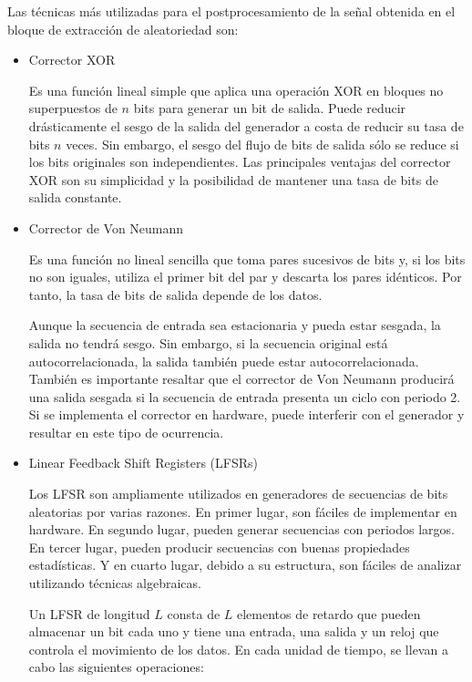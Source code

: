             Las técnicas más utilizadas para el postprocesamiento de la señal obtenida en el bloque de extracción de aleatoriedad son: 
	
            \begin{itemize}
                \item Corrector XOR 
                
                    Es una función lineal simple que aplica una operación XOR en bloques no superpuestos de $n$ bits para generar un bit de salida. Puede reducir drásticamente el sesgo de la salida del generador a costa de reducir su tasa de bits $n$ veces. Sin embargo, el sesgo del flujo de bits de salida sólo se reduce si los bits originales son independientes. Las principales ventajas del corrector XOR son su simplicidad y la posibilidad de mantener una tasa de bits de salida constante.

                \item Corrector de Von Neumann
                
                    Es una función no lineal sencilla que toma pares sucesivos de bits y, si los bits no son iguales, utiliza el primer bit del par y descarta los pares idénticos. Por tanto, la tasa de bits de salida depende de los datos.

                    Aunque la secuencia de entrada sea estacionaria y pueda estar sesgada, la salida no tendrá sesgo. Sin embargo, si la secuencia original está autocorrelacionada, la salida también puede estar autocorrelacionada. También es importante resaltar que el corrector de Von Neumann producirá una salida sesgada si la secuencia de entrada presenta un ciclo con periodo 2. Si se implementa el corrector en hardware, puede interferir con el generador y resultar en este tipo de ocurrencia.

                \item Linear Feedback Shift Registers (LFSRs)
                
                    Los LFSR son ampliamente utilizados en generadores de secuencias de bits aleatorias por varias razones. En primer lugar, son fáciles de implementar en hardware. En segundo lugar, pueden generar secuencias con periodos largos. En tercer lugar, pueden producir secuencias con buenas propiedades estadísticas. Y en cuarto lugar, debido a su estructura, son fáciles de analizar utilizando técnicas algebraicas.

                    Un LFSR de longitud $L$ consta de $L$ elementos de retardo que pueden almacenar un bit cada uno y tiene una entrada, una salida y un reloj que controla el movimiento de los datos. En cada unidad de tiempo, se llevan a cabo las siguientes operaciones:


\end{itemize}
